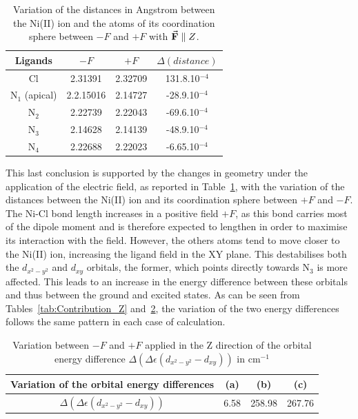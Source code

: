 \documentclass[12pt]{report}
\numberwithin{equation}{section}
\begin{document}
\begin{table}[!ht]
    \centering
    \begin{tabular}{| c | c| c | c |}
        \hline
        Ligands & $-F$ & $+F$ &$\Delta(distance)$\\
        \hline
        Cl & 2.31391& 2.32709&  131.8.10$^{-4}$\\
        N$_1$ (apical) & 2.2.15016  & 2.14727 &-28.9.10$^{-4}$\\
        N$_2$ & 2.22739 & 2.22043&-69.6.10$^{-4}$ \\
        N$_3$ & 2.14628& 2.14139&-48.9.10$^{-4}$ \\
        N$_4$ & 2.22688 & 2.22023 &-6.65.10$^{-4}$\\
        \hline
    \end{tabular}
    \caption{Variation of the distances in Angstrom between the Ni(II) ion and the atoms of its coordination sphere between $-F$ and $+F$ with $\vec{\vb{F}}\parallel Z$.}
    \label{tab:DistanceZ}
\end{table}
This last conclusion is supported by the changes in geometry under the application of the electric field, as reported in Table~\ref{tab:DistanceZ}, with the variation of the distances between the Ni(II) ion and its coordination sphere between $+F$ and $-F$.
The Ni-Cl bond length increases in a positive field $+F$, as this bond carries most of the dipole moment and is therefore expected to lengthen in order to maximise its interaction with the field. 
However, the others atoms tend to move closer to the Ni(II) ion, increasing the ligand field in the XY plane. 
This destabilises both the $d_{x^2-y^2}$ and $d_{xy}$ orbitals, the former, which points directly towards N$_3$ is more affected.
This leads to an increase in the energy difference between these orbitals and thus between the ground and excited states.
As can be seen from Tables~\ref{tab:Contribution_Z} and~\ref{tab:EOrbitaleZ}, the variation of the two energy differences follows the same pattern in each case of calculation.

\begin{table}[h]
    \centering
    \begin{tabular}{|c | c c c |}
        \hline
        Variation of the orbital energy differences & (a) & (b) & (c)\\
        \hline
        $\Delta(\Delta \epsilon (d_{x^2-y^2}-d_{xy}))$& 6.58 & 258.98 & 267.76\\
        \hline
    \end{tabular}
    \caption{Variation between $-F$ and $+F$ applied in the Z direction of the orbital energy difference $\Delta(\Delta \epsilon (d_{x^2-y^2}-d_{xy}))$ in cm$^{-1}$}
    \label{tab:EOrbitaleZ}
\end{table}
\end{document}
